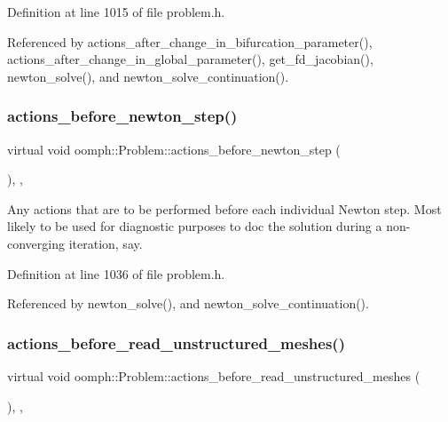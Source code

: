 Definition at line 1015 of file problem.\+h.



Referenced by actions\+\_\+after\+\_\+change\+\_\+in\+\_\+bifurcation\+\_\+parameter(), actions\+\_\+after\+\_\+change\+\_\+in\+\_\+global\+\_\+parameter(), get\+\_\+fd\+\_\+jacobian(), newton\+\_\+solve(), and newton\+\_\+solve\+\_\+continuation().

\mbox{\label{classoomph_1_1Problem_a07fc81781c74b25c8a426ec18295b0d0}} 
\subsubsection{\texorpdfstring{actions\+\_\+before\+\_\+newton\+\_\+step()}{actions\_before\_newton\_step()}}
{\footnotesize\ttfamily virtual void oomph\+::\+Problem\+::actions\+\_\+before\+\_\+newton\+\_\+step (\begin{DoxyParamCaption}{ }\end{DoxyParamCaption})\hspace{0.3cm}{\ttfamily [inline]}, {\ttfamily [protected]}, {\ttfamily [virtual]}}



Any actions that are to be performed before each individual Newton step. Most likely to be used for diagnostic purposes to doc the solution during a non-\/converging iteration, say. 



Definition at line 1036 of file problem.\+h.



Referenced by newton\+\_\+solve(), and newton\+\_\+solve\+\_\+continuation().

\mbox{\label{classoomph_1_1Problem_af10662119a7a0c3a47879fa0d0644452}} 
\subsubsection{\texorpdfstring{actions\+\_\+before\+\_\+read\+\_\+unstructured\+\_\+meshes()}{actions\_before\_read\_unstructured\_meshes()}}
{\footnotesize\ttfamily virtual void oomph\+::\+Problem\+::actions\+\_\+before\+\_\+read\+\_\+unstructured\+\_\+meshes (\begin{DoxyParamCaption}{ }\end{DoxyParamCaption})\hspace{0.3cm}{\ttfamily [inline]}, {\ttfamily [protected]}, {\ttfamily [virtual]}}



